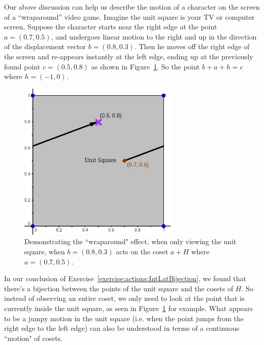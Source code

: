 Our above discussion can help us describe the motion of a character on the screen of a ``wraparound'' video game.  Imagine the unit square is your TV or computer screen. Suppose the character starts near the right edge at the point $a=(0.7,0.5)$, and undergoes linear motion to the right and up in the direction of the displacement vector $b=(0.8,0.3)$. Then he moves off the right edge of the screen and re-appears instantly at the left edge, ending up at the previously found point $c=(0.5,0.8)$ as shown in Figure~\ref{fig:wraparound1}. So the point $b+a+h=c$ where $h=(-1,0)$.

\begin{figure}[htpb]
\begin{center}
\includegraphics[width=3in]{images/Lattice_wraparound1.png}
\caption{\label{fig:wraparound1}Demonstrating the ``wraparound" effect, when only viewing the unit square, when $b=(0.8,0.3)$ acts on the coset $a+H$ where $a=(0.7,0.5)$.}
\end{center}
\end{figure}

In our conclusion of Exercise~\ref{exercise:actions:IntLatBijection}, we found that there's a bijection between the points of the unit square and the cosets of $H$. So instead of observing an entire coset, we only need to look at the point that is currently inside the unit square, as seen in Figure~\ref{fig:wraparound1} for example. What appears to be a jumpy motion in the unit square (i.e. when the point jumps from the right edge to the left edge) can also be understood in terms of a continuous ``motion" of cosets.

